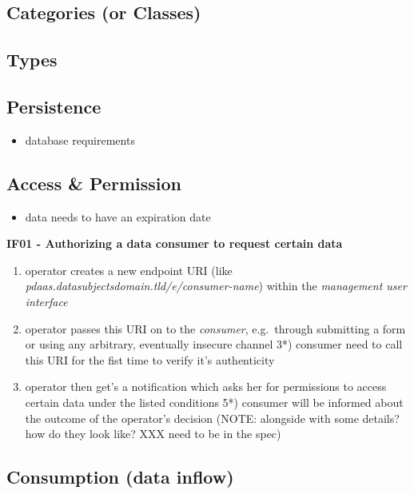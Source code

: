 \documentclass[12pt,english,a4paper,titlepage,cleardoublepage=empty,dottedtoc]{report}
\providecommand{\tightlist}{%
  \setlength{\itemsep}{0pt}\setlength{\parskip}{0pt}}
\begin{document}
\subsection{Categories (or Classes)}\label{categories-or-classes}

\subsection{Types}\label{types}

\subsection{Persistence}\label{persistence-1}

\begin{itemize}
\tightlist
\item
  database requirements
\end{itemize}

\subsection{Access \& Permission}\label{access-permission}

\begin{itemize}
\tightlist
\item
  data needs to have an expiration date
\end{itemize}

\textbf{IF01 - Authorizing a data consumer to request certain data}

\begin{enumerate}
\def\labelenumi{\arabic{enumi})}
\tightlist
\item
  operator creates a new endpoint URI (like
  \emph{pdaas.datasubjectsdomain.tld/e/consumer-name}) within the
  \emph{management user interface}
\item
  operator passes this URI on to the \emph{consumer}, e.g.~through
  submitting a form or using any arbitrary, eventually insecure channel
  3*) consumer need to call this URI for the fist time to verify it's
  authenticity
\item
  operator then get's a notification which asks her for permissions to
  access certain data under the listed conditions 5*) consumer will be
  informed about the outcome of the operator's decision (NOTE: alongside
  with some details? how do they look like? XXX need to be in the spec)
\end{enumerate}

\subsection{Consumption (data inflow)}\label{consumption-data-inflow}
\end{document}
